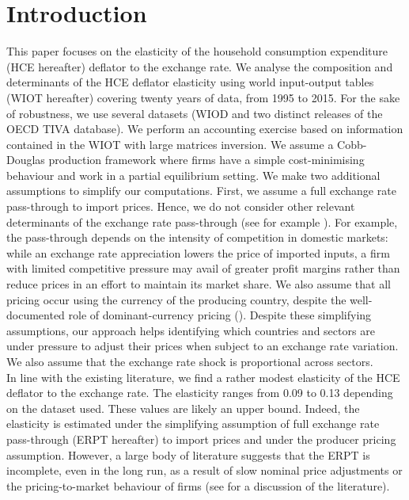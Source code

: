 \documentclass[12pt,a4paper]{paper}
\begin{document}
\section*{Introduction}
This paper focuses on the elasticity of the household consumption expenditure (HCE hereafter) deflator to the exchange rate. 
We analyse the composition and determinants of the HCE deflator elasticity using world input-output tables (WIOT hereafter) covering twenty years of data, from 1995 to 2015.
For the sake of robustness, we use several datasets (WIOD and two distinct releases of the OECD TIVA database). 
We perform an accounting exercise based on information contained in the WIOT with large matrices inversion. 
We assume a Cobb-Douglas production framework where firms have a simple cost-minimising behaviour and work in a partial equilibrium setting.
We make two additional assumptions to simplify our computations. 
First, we assume a full exchange rate pass-through to import prices. 
Hence, we do not consider other relevant determinants of the exchange rate pass-through (see for example \cite{Berman2012}).
For example, the pass-through depends on the intensity of competition in domestic markets: while an exchange rate appreciation lowers the price of imported inputs, a ﬁrm with limited competitive pressure may avail of greater proﬁt margins rather than reduce prices in an eﬀort to maintain its market share.
We also assume that all pricing occur using the currency of the producing country, despite the well-documented role of dominant-currency pricing (\cite{Gopinath2020}).
Despite these simplifying assumptions, our approach helps identifying which countries and sectors are under pressure to adjust their prices when subject to an exchange rate variation.
We also assume that the exchange rate shock is proportional across sectors. \\
In line with the existing literature, we find a rather modest elasticity of the HCE deflator to the exchange rate.
The elasticity ranges from 0.09 to 0.13 depending on the dataset used.
These values are likely an upper bound. 
Indeed, the elasticity is estimated under the simplifying assumption of full exchange rate pass-through (ERPT hereafter) to import prices and under the producer pricing assumption.
However, a large body of literature suggests that the ERPT is incomplete, even in the long run, as a result of slow nominal price adjustments or the pricing-to-market behaviour of firms (see \cite{Ozyurt2016} for a discussion of the literature).
\end{document}
